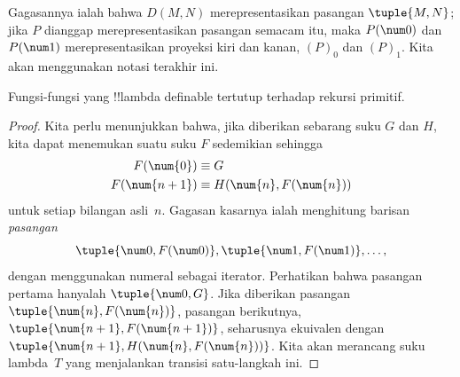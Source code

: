 \documentclass[../../../include/open-logic-section]{subfiles}
\begin{document}
Gagasannya ialah bahwa $D(M,N)$ merepresentasikan pasangan $\tuple{M,N}$;
jika $P$ dianggap merepresentasikan pasangan semacam itu, maka $P(\num 0)$ dan
$P(\num 1)$ merepresentasikan proyeksi kiri dan kanan, $(P)_0$ dan $(P)_1$.
Kita akan menggunakan notasi terakhir ini.

\begin{lem}
Fungsi-fungsi yang !!{lambda definable} tertutup terhadap rekursi primitif.
\end{lem}

\begin{proof}
Kita perlu menunjukkan bahwa, jika diberikan sebarang suku $G$ dan $H$, kita
dapat menemukan suatu suku $F$ sedemikian sehingga
\begin{align*}
F(\num{0}) & \equiv G \\
F(\num{n+1}) & \equiv H(\num{n}, F(\num{n}))
\end{align*}
untuk setiap bilangan asli~$n$. Gagasan kasarnya ialah menghitung barisan
\emph{pasangan}
\[
\tuple{\num 0, F(\num 0)}, \tuple{\num 1, F(\num 1)}, \dots,
\]
dengan menggunakan numeral sebagai iterator. Perhatikan bahwa pasangan pertama
hanyalah $\tuple{\num 0,G}$. Jika diberikan pasangan
$\tuple{\num{n},F(\num{n})}$, pasangan berikutnya,
$\tuple{\num{n+1},F(\num{n+1})}$, seharusnya ekuivalen dengan
$\tuple{\num{n+1},H(\num{n},F(\num{n}))}$. Kita akan merancang suku
lambda~$T$ yang menjalankan transisi satu-langkah ini.


\end{proof}
\end{document}
